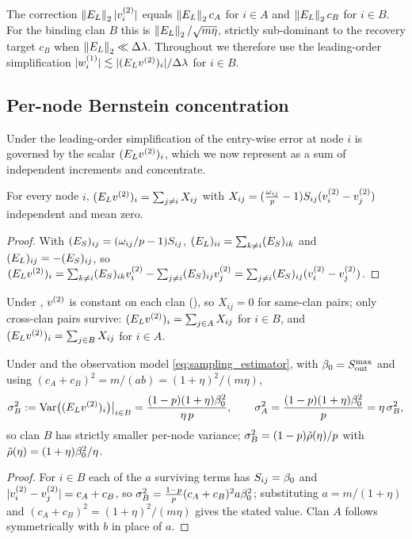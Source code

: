 \begin{remark}\label{rem:C-asym}
The correction $\left\lVert E_{L} \right\rVert_{2}|v^{(2)}_i|$ equals $\left\lVert E_{L} \right\rVert_{2}c_A$ for $i\in A$ and
$\left\lVert E_{L} \right\rVert_{2}c_B$ for $i\in B$. For the binding clan $B$ this is
$\left\lVert E_{L} \right\rVert_{2}/\sqrt{m\eta}$, strictly sub-dominant to the recovery target $c_B$
when $\left\lVert E_{L} \right\rVert_{2}\ll\Delta\lambda$. Throughout  we therefore use the
leading-order simplification $|w^{(1)}_i|\lesssim|(E_{L}v^{(2)})_i|/\Delta\lambda$ for $i\in B$.
\end{remark}

\subsection{Per-node Bernstein concentration}\label{app:comp3b}

Under the leading-order simplification of  the entry-wise error
at node $i$ is governed by the scalar $(E_{L}v^{(2)})_i$, which we now represent as a
sum of independent increments and concentrate.

\begin{lemma}\label{lem:C-inc}
For every node $i$, $(E_{L}v^{(2)})_i=\sum_{j\ne i}X_{ij}$ with
$X_{ij}=(\tfrac{\omega_{ij}}{p}-1)S_{ij}(v^{(2)}_i-v^{(2)}_j)$ independent and mean zero.
\end{lemma}
\begin{proof}
With $(E_{S})_{ij}=(\omega_{ij}/p-1)S_{ij}$, $(E_{L})_{ii}=\sum_{k\ne i}(E_{S})_{ik}$ and
$(E_{L})_{ij}=-(E_{S})_{ij}$, so
$(E_{L}v^{(2)})_i=\sum_{k\ne i}(E_{S})_{ik}v^{(2)}_i-\sum_{j\ne i}(E_{S})_{ij}v^{(2)}_j
=\sum_{j\ne i}(E_{S})_{ij}(v^{(2)}_i-v^{(2)}_j)$.
\end{proof}

\begin{proposition}\label{prop:C-within}
Under , $v^{(2)}$ is constant on each clan (), so
$X_{ij}=0$ for same-clan pairs; only cross-clan pairs survive:
$(E_{L}v^{(2)})_i=\sum_{j\in A}X_{ij}$ for $i\in B$, and
$(E_{L}v^{(2)})_i=\sum_{j\in B}X_{ij}$ for $i\in A$.
\end{proposition}

\begin{proposition}\label{prop:C-var}
Under  and the observation model \eqref{eq:sampling_estimator}, with
$\beta_0=S_{\mathrm{out}}^{\max}$ and using
$(c_A+c_B)^2=m/(ab)=(1+\eta)^2/(m\eta)$,
\begin{equation}
   \sigma_B^2:=\operatorname{Var}\bigl((E_{L}v^{(2)})_i\bigr)\big|_{i\in B}
   =\frac{(1-p)(1+\eta)\beta_0^2}{\eta\,p},
   \qquad
   \sigma_A^2=\frac{(1-p)(1+\eta)\beta_0^2}{p}=\eta\,\sigma_B^2,
\end{equation}
so clan $B$ has strictly smaller per-node variance;
$\sigma_B^2=(1-p)\tilde\rho(\eta)/p$ with $\tilde\rho(\eta)=(1+\eta)\beta_0^2/\eta$.
\end{proposition}
\begin{proof}
For $i\in B$ each of the $a$ surviving terms has $S_{ij}=\beta_0$ and
$|v^{(2)}_i-v^{(2)}_j|=c_A+c_B$, so $\sigma_B^2=\tfrac{1-p}{p}(c_A+c_B)^2a\beta_0^2$;
substituting $a=m/(1+\eta)$ and $(c_A+c_B)^2=(1+\eta)^2/(m\eta)$ gives the stated
value. Clan $A$ follows symmetrically with $b$ in place of $a$.
\end{proof}

